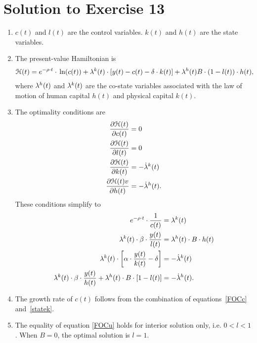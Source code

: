 \documentclass[letterpaper,12pt,leqno]{article}
\begin{document}
\section*{Solution to Exercise 13}
\begin{enumerate}
\item $c(t)$ and $l(t)$ are the control variables. $k(t)$ and $h(t)$ are the state variables.
\item The present-value Hamiltonian is
\begin{align*}
\Hc(t)=e^{-\rho \cdot t}\cdot \ln{c(t)} +\l^{k}(t)\cdot \bs{y(t)-c(t)-\d\cdot  k(t)} +\l^{h}(t) B\cdot \bp{1-l(t)}\cdot  h(t),
\end{align*}
where $\lambda^{h}(t)$ and $\lambda^{k}(t)$ are the co-state variables associated with the law of motion of human capital $h(t)$ and physical capital $k(t)$.

\item The optimality conditions are
\begin{align*}
\frac{\partial \mathcal{H}(t)}{\partial c(t)} &=0\\
\frac{\partial \mathcal{H}(t)}{\partial l(t)}&=0 \\
\frac{\partial \mathcal{H}(t)}{\partial k(t)} &=-\dot{\lambda}^{k}(t)\\
\frac{\partial \mathcal{H}(t)v}{\partial h(t)}&=-\dot{\lambda}^{h}(t).
\end{align*}
These conditions simplify to
\begin{align}
e^{-\rho \cdot t}\cdot \frac{1}{c(t)} &=\lambda^{k}(t) \label{FOCc} \\
\lambda^{k}(t)\cdot \beta \cdot\frac{ y(t)}{l(t)} &=\lambda^{h}(t)\cdot B\cdot h(t)  \label{FOCu} \\
\lambda^{k}(t)\cdot \left[ \alpha\cdot  \frac{y(t)}{k(t)}-\delta \right] &=-\dot{\lambda}^{k}(t)  \label{statek}\\
\lambda^{k}(t)\cdot \beta \cdot\frac{ y(t)}{h(t)}+\lambda^{h}(t)\cdot B\cdot \left[ 1-l(t) \right] &=-\dot{\lambda}^{h}(t)\label{stateh}.
\end{align}
\item The growth rate of $c(t)$ follows from the combination of equations~\eqref{FOCc} and~\eqref{statek}.

\item The equality of equation \eqref{FOCu} holds for
interior solution only, i.e. $0<l<1$. When $B=0$, the optimal solution is $
l=1$.


\end{enumerate}
\end{document}

